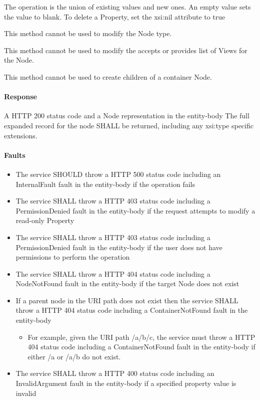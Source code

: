 \documentclass[11pt,a4paper]{ivoa}
\begin{document}
The operation is the union of existing values and new ones.  An empty value sets the value to blank.  To delete a Property, set the xsi:nil attribute to true

This method cannot be used to modify the Node type.

This method cannot be used to modify the accepts or provides list of Views for the Node.

This method cannot be used to create children of a container Node.

\paragraph{Response}
A HTTP 200 status code and a Node representation in the entity-body
The full expanded record for the node SHALL be returned, including any xsi:type specific extensions.

\paragraph{Faults}
\begin{itemize}
    \item The service SHOULD throw a HTTP 500 status code including an InternalFault fault in the entity-body if the operation fails
    \item The service SHALL throw a HTTP 403 status code including a PermissionDenied fault in the entity-body if the request attempts to modify a read-only Property
    \item The service SHALL throw a HTTP 403 status code including a PermissionDenied fault in the entity-body if the user does not have permissions to perform the operation
    \item The service SHALL throw a HTTP 404 status code including a NodeNotFound fault in the entity-body if the target Node does not exist
    \item If a parent node in the URI path does not exist then the service SHALL throw a HTTP 404 status code including a ContainerNotFound fault in the entity-body
    \begin{itemize}
        \item For example, given the URI path /a/b/c, the service must throw a HTTP 404 status code including a ContainerNotFound fault in the entity-body if either /a or /a/b do not exist.
    \end{itemize}
    \item The service SHALL throw a HTTP 400 status code including an InvalidArgument fault in the entity-body if a specified property value is invalid
\end{itemize}
\end{document}
